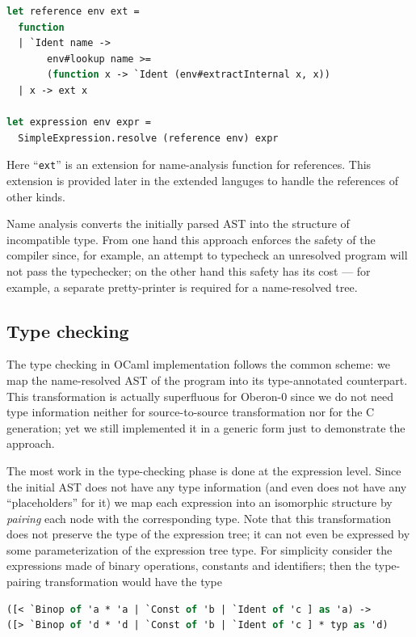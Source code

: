 \begin{lstlisting}[language=ocaml]
let reference env ext = 
  function
  | `Ident name -> 
       env#lookup name >= 
       (function x -> `Ident (env#extractInternal x, x))
  | x -> ext x

let expression env expr = 
  SimpleExpression.resolve (reference env) expr 
\end{lstlisting}

Here ``\lstinline{ext}'' is an extension for name-analysis function for references. This 
extension is provided later in the extended languges to handle the references of other kinds.

Name analysis converts the initially parsed AST into the structure of incompatible 
type. From one hand this approach enforces the safety of the compiler since, for example, an attempt
to typecheck an unresolved program will not pass the typechecker; on the other hand this
safety has its cost --- for example, a separate pretty-printer is required for a
name-resolved tree. 

\subsection{Type checking}

The type checking in OCaml implementation follows the common scheme: we map the name-resolved
AST of the program into its type-annotated counterpart. This transformation is
actually superfluous for Oberon-0 since we do not need type information neither for
source-to-source transformation nor for the C generation; yet we still implemented it in
a generic form just to demonstrate the approach.

The most work in the type-checking phase is done at the expression level. Since the 
initial AST does not have any type information (and even does not have any ``placeholders'' 
for it) we map each expression into an isomorphic structure by \emph{pairing} each node 
with the corresponding type. Note that this transformation does not preserve the type of
the expression tree; it can not even be expressed by some parameterization of the
expression tree type. For simplicity consider the expressions made of binary operations,
constants and identifiers; then the type-pairing transformation would have the type

\begin{lstlisting}[language=ocaml]
([< `Binop of 'a * 'a | `Const of 'b | `Ident of 'c ] as 'a) ->
([> `Binop of 'd * 'd | `Const of 'b | `Ident of 'c ] * typ as 'd)
\end{lstlisting}

